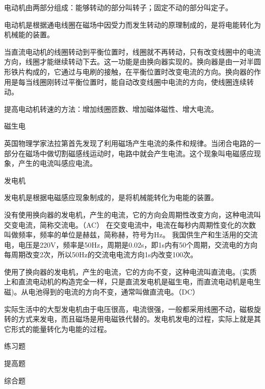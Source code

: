 \documentclass[12pt]{exam}
\renewcommand{\section}[1]{{\large\sffamily  #1} \par}
\renewcommand{\subsection}[1]{{\normalsize\sffamily  #1} \par}
\begin{document}
电动机由两部分组成：能够转动的部分叫转子；固定不动的部分叫定子。

电动机是根据通电线圈在磁场中因受力而发生转动的原理制成的，是将电能转化为机械能的装置。


当直流电动机的线圈转动到平衡位置时，线圈就不再转动，只有改变线圈中的电流方向，线圈才能继续转动下去。这一功能是由换向器实现的。换向器是由一对半圆形铁片构成的，它通过与电刷的接触，在平衡位置时改变电流的方向。换向器的作用是每当线圈刚转过平衡位置时，能自动改变线圈中电流的方向，使线圈连续转动。

提高电动机转速的方法：增加线圈匝数、增加磁体磁性、增大电流。


\section{磁生电}
英国物理学家法拉第首先发现了利用磁场产生电流的条件和规律。当闭合电路的一部分在磁场中做切割磁感线运动时，电路中就会产生电流。这个现象叫电磁感应现象，产生的电流叫感应电流。

\subsection{发电机}
发电机是根据电磁感应现象制成的，是将机械能转化为电能的装置。


没有使用换向器的发电机，产生的电流，它的方向会周期性改变方向，这种电流叫交变电流，简称交流电。（AC）
在交变电流中，电流在每秒内周期性变化的次数叫做频率，频率的单位是赫兹，简称赫，符号为Hz。
我国供生产和生活用的交流电，电压是220V，频率是50Hz，周期是0.02s，即1s内有50个周期，交流电的方向每周期改变2次，所以50Hz的交流电电流方向1s内改变100次。

使用了换向器的发电机，产生的电流，它的方向不变，这种电流叫直流电。(实质上和直流电动机的构造完全一样，只是直流发电机是磁生电，而直流电动机是电生磁)。从电池得到的电流的方向不变，通常叫做直流电。（DC）

实际生活中的大型发电机由于电压很高，电流很强，一般都采用线圈不动，磁极旋转的方式来发电，而且磁场是用电磁铁代替的。发电机发电的过程，实际上就是其它形式的能量转化为电能的过程。



\section{练习题}














\begin{improveexercises}
\section{提高题}

\end{improveexercises}

\begin{advanceexercises}
\section{综合题}

\end{advanceexercises}

\end{document}
